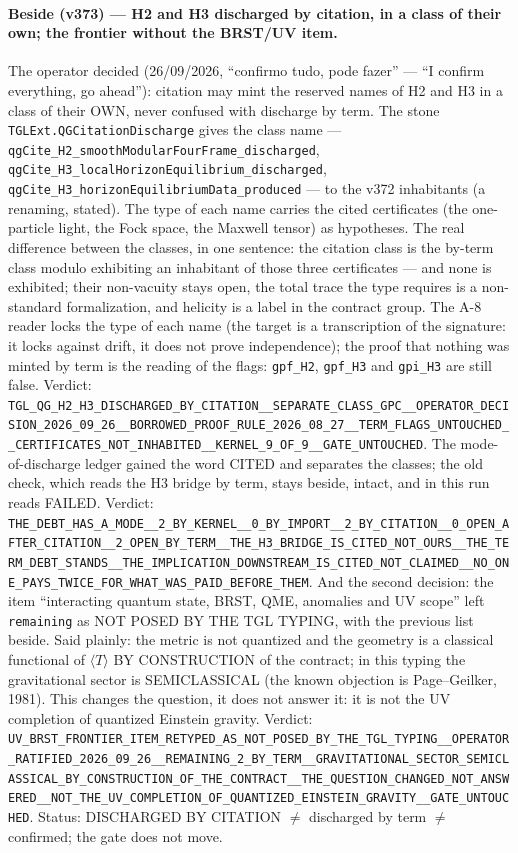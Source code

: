 \documentclass[11pt]{article}
\theoremstyle{definition}\newtheorem{deriv}{Derivation}
\begin{document}
\paragraph*{Beside (v373) --- H2 and H3 discharged by citation, in a class of their own; the frontier without the BRST/UV item.} The operator decided (26/09/2026, ``confirmo tudo, pode fazer'' --- ``I confirm everything, go ahead''): citation may mint the reserved names of H2 and H3 in a class of their OWN, never confused with discharge by term. The stone \texttt{TGLExt.QGCitationDischarge} gives the class name --- \texttt{qgCite\_H2\_smoothModularFourFrame\_discharged}, \texttt{qgCite\_H3\_localHorizonEquilibrium\_discharged}, \texttt{qgCite\_H3\_horizonEquilibriumData\_produced} --- to the v372 inhabitants (a renaming, stated). The type of each name carries the cited certificates (the one-particle light, the Fock space, the Maxwell tensor) as hypotheses. The real difference between the classes, in one sentence: the citation class is the by-term class modulo exhibiting an inhabitant of those three certificates --- and none is exhibited; their non-vacuity stays open, the total trace the type requires is a non-standard formalization, and helicity is a label in the contract group. The A-8 reader locks the type of each name (the target is a transcription of the signature: it locks against drift, it does not prove independence); the proof that nothing was minted by term is the reading of the flags: \texttt{gpf\_H2}, \texttt{gpf\_H3} and \texttt{gpi\_H3} are still false. Verdict: \texttt{TGL\_QG\_H2\_H3\_DISCHARGED\_BY\_CITATION\_\_SEPARATE\_CLASS\_GPC\_\_OPERATOR\_DECISION\_2026\_09\_26\_\_BORROWED\_PROOF\_RULE\_2026\_08\_27\_\_TERM\_FLAGS\_UNTOUCHED\_\_CERTIFICATES\_NOT\_INHABITED\_\_KERNEL\_9\_OF\_9\_\_GATE\_UNTOUCHED}. The mode-of-discharge ledger gained the word CITED and separates the classes; the old check, which reads the H3 bridge by term, stays beside, intact, and in this run reads FAILED. Verdict: \texttt{THE\_DEBT\_HAS\_A\_MODE\_\_2\_BY\_KERNEL\_\_0\_BY\_IMPORT\_\_2\_BY\_CITATION\_\_0\_OPEN\_AFTER\_CITATION\_\_2\_OPEN\_BY\_TERM\_\_THE\_H3\_BRIDGE\_IS\_CITED\_NOT\_OURS\_\_THE\_TERM\_DEBT\_STANDS\_\_THE\_IMPLICATION\_DOWNSTREAM\_IS\_CITED\_NOT\_CLAIMED\_\_NO\_ONE\_PAYS\_TWICE\_FOR\_WHAT\_WAS\_PAID\_BEFORE\_THEM}. And the second decision: the item ``interacting quantum state, BRST, QME, anomalies and UV scope'' left \texttt{remaining} as NOT POSED BY THE TGL TYPING, with the previous list beside. Said plainly: the metric is not quantized and the geometry is a classical functional of $\langle T\rangle$ BY CONSTRUCTION of the contract; in this typing the gravitational sector is SEMICLASSICAL (the known objection is Page--Geilker, 1981). This changes the question, it does not answer it: it is not the UV completion of quantized Einstein gravity. Verdict: \texttt{UV\_BRST\_FRONTIER\_ITEM\_RETYPED\_AS\_NOT\_POSED\_BY\_THE\_TGL\_TYPING\_\_OPERATOR\_RATIFIED\_2026\_09\_26\_\_REMAINING\_2\_BY\_TERM\_\_GRAVITATIONAL\_SECTOR\_SEMICLASSICAL\_BY\_CONSTRUCTION\_OF\_THE\_CONTRACT\_\_THE\_QUESTION\_CHANGED\_NOT\_ANSWERED\_\_NOT\_THE\_UV\_COMPLETION\_OF\_QUANTIZED\_EINSTEIN\_GRAVITY\_\_GATE\_UNTOUCHED}. Status: DISCHARGED BY CITATION $\neq$ discharged by term $\neq$ confirmed; the gate does not move.
\end{document}

